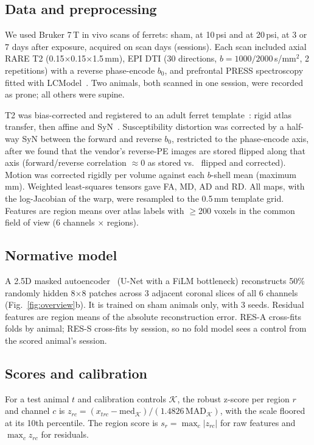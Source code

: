 \documentclass{article}
\begin{document}
\subsection{Data and preprocessing}
We used Bruker 7\,T in vivo scans of \Nanimals{} ferrets: \Nsham{} sham, \Ntenpsi{} at 10\,psi and \Ntwentypsi{} at 20\,psi, at 3 or 7 days after exposure, acquired on \Nsessions{} scan days (sessions). Each scan included axial RARE T2 (0.15$\times$0.15$\times$1.5\,mm), EPI DTI (30 directions, $b=1000/2000$\,s/mm$^2$, 2 repetitions) with a reverse phase-encode $b_0$, and prefrontal PRESS spectroscopy fitted with LCModel~\cite{provencher1993}. Two animals, both scanned in one session, were recorded as prone; all others were supine.

T2 was bias-corrected and registered to an adult ferret template~\cite{hutchinson2017}: rigid atlas transfer, then affine and SyN~\cite{avants2008}. Susceptibility distortion was corrected by a half-way SyN between the forward and reverse $b_0$, restricted to the phase-encode axis, after we found that the vendor's reverse-PE images are stored flipped along that axis (forward/reverse correlation $\approx$0 as stored vs.\ \SDCbefore{} flipped and \SDCafter{} corrected). Motion was corrected rigidly per volume against each $b$-shell mean (maximum \Motion\,mm). Weighted least-squares tensors gave FA, MD, AD and RD. All maps, with the log-Jacobian of the warp, were resampled to the 0.5\,mm template grid. Features are region means over \Nregions{} atlas labels with $\geq$200 voxels in the common field of view (6 channels $\times$ \Nregions{} regions).

\subsection{Normative model}
A 2.5D masked autoencoder~\cite{he2022} (U-Net with a FiLM bottleneck) reconstructs 50\% randomly hidden 8$\times$8 patches across 3 adjacent coronal slices of all 6 channels (Fig.~\ref{fig:overview}b). It is trained on sham animals only, with 3 seeds. Residual features are region means of the absolute reconstruction error. RES-A cross-fits folds by animal; RES-S cross-fits by session, so no fold model sees a control from the scored animal's session.

\subsection{Scores and calibration}
For a test animal $t$ and calibration controls $\mathcal{K}$, the robust z-score per region $r$ and channel $c$ is $z_{rc}=(x_{trc}-\mathrm{med}_\mathcal{K})/(1.4826\,\mathrm{MAD}_\mathcal{K})$, with the scale floored at its 10th percentile. The region score is $s_r=\max_c |z_{rc}|$ for raw features and $\max_c z_{rc}$ for residuals.
\end{document}

